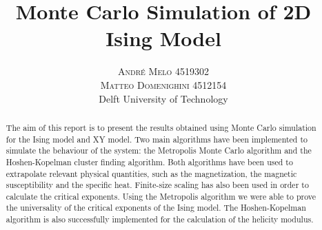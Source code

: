 \documentclass[twoside]{article}
\title{\vspace{-15mm}\fontsize{24pt}{10pt}\selectfont\textbf{Monte Carlo Simulation of 2D Ising Model}} %
\author{
\large
\textsc{Andr\'e Melo 4519302}\\
\textsc{Matteo Domenighini 4512154} \\[2mm] %
\normalsize Delft University of Technology\\ %
\vspace{-5mm}
}
\date{}
\begin{document}
\maketitle %


\begin{abstract}

\noindent The aim of this report is to present the results obtained using Monte Carlo simulation for the Ising model and XY model. Two main algorithms have been implemented to simulate the behaviour of the system: the Metropolis Monte Carlo algorithm and the Hoshen-Kopelman cluster finding algorithm. Both algorithms have been used to extrapolate relevant physical quantities, such as the magnetization, the magnetic susceptibility and the specific heat. Finite-size scaling has also been used in order to calculate the critical exponents. Using the Metropolis algorithm we were able to prove the universality of the critical exponents of the Ising model. 
The Hoshen-Kopelman algorithm is also successfully implemented for the calculation of the helicity modulus.

\end{abstract}

\end{document}
